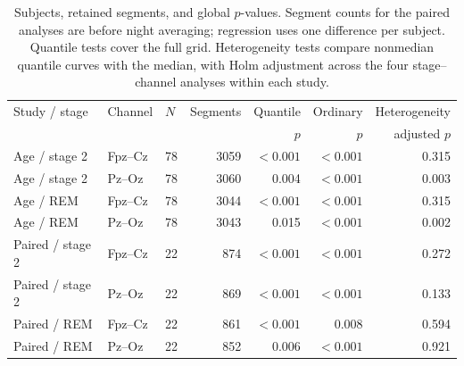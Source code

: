 \begin{table}[htbp]
\centering
\caption{Subjects, retained segments, and global $p$-values. Segment counts for the paired analyses are before night averaging; regression uses one difference per subject. Quantile tests cover the full grid. Heterogeneity tests compare nonmedian quantile curves with the median, with Holm adjustment across the four stage--channel analyses within each study.}\label{tab:eeg}
\small
\setlength{\tabcolsep}{4pt}
\begin{tabular}{lllrrrr}
\toprule
Study / stage & Channel & $N$ & Segments & Quantile & Ordinary & Heterogeneity\\
 & & & & $p$ & $p$ & adjusted $p$\\
\midrule
Age / stage 2 & Fpz--Cz & 78 & 3059 & $<0.001$ & $<0.001$ & 0.315 \\
Age / stage 2 & Pz--Oz & 78 & 3060 & 0.004 & $<0.001$ & 0.003 \\
Age / REM & Fpz--Cz & 78 & 3044 & $<0.001$ & $<0.001$ & 0.315 \\
Age / REM & Pz--Oz & 78 & 3043 & 0.015 & $<0.001$ & 0.002 \\
\addlinespace
Paired / stage 2 & Fpz--Cz & 22 & 874 & $<0.001$ & $<0.001$ & 0.272 \\
Paired / stage 2 & Pz--Oz & 22 & 869 & $<0.001$ & $<0.001$ & 0.133 \\
Paired / REM & Fpz--Cz & 22 & 861 & $<0.001$ & 0.008 & 0.594 \\
Paired / REM & Pz--Oz & 22 & 852 & 0.006 & $<0.001$ & 0.921 \\
\bottomrule
\end{tabular}
\end{table}
